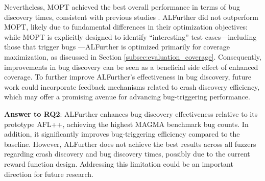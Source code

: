 \documentclass[lettersize,journal]{IEEEtran}
\begin{document}
Nevertheless, MOPT achieved the best overall performance in terms of bug discovery times, consistent with previous studies \cite{hazimehMagmaGroundtruthFuzzing2021,metzmanFuzzBenchOpenFuzzer2021}. ALFurther did not outperform MOPT, likely due to fundamental differences in their optimization objectives: while MOPT is explicitly designed to identify “interesting” test cases—including those that trigger bugs \cite{lyuMOPTOptimizedMutation2019}—ALFurther is optimized primarily for coverage maximization, as discussed in Section \ref{subsec:evaluation_coverage}. Consequently, improvements in bug discovery can be seen as a beneficial side effect of enhanced coverage. To further improve ALFurther’s effectiveness in bug discovery, future work could incorporate feedback mechanisms related to crash discovery efficiency, which may offer a promising avenue for advancing bug-triggering performance.

\textbf{Answer to RQ2}: ALFurther enhances bug discovery effectiveness relative to its prototype AFL++, achieving the highest MAGMA benchmark bug counts. In addition, it significantly improves bug-triggering efficiency compared to the baseline. However, ALFurther does not achieve the best results across all fuzzers regarding crash discovery and bug discovery times, possibly due to the current reward function design. Addressing this limitation could be an important direction for future research.
\end{document}
